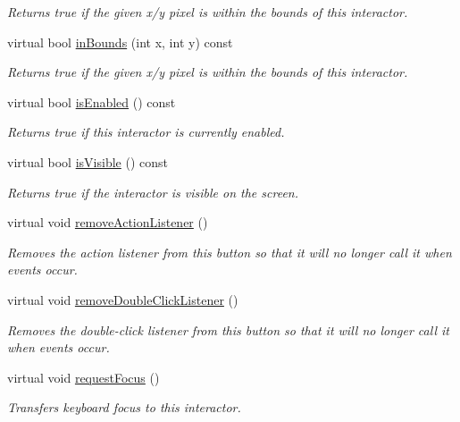 \begin{DoxyCompactItemize}
\begin{DoxyCompactList}\small\item\em Returns true if the given x/y pixel is within the bounds of this interactor. \end{DoxyCompactList}\item 
virtual bool \mbox{\hyperlink{classGInteractor_ae6d7982c1c627b677a5e776ca86118ed}{in\+Bounds}} (int x, int y) const
\begin{DoxyCompactList}\small\item\em Returns true if the given x/y pixel is within the bounds of this interactor. \end{DoxyCompactList}\item 
virtual bool \mbox{\hyperlink{classGInteractor_aacb819fb241851fd9fc045271baa4034}{is\+Enabled}} () const
\begin{DoxyCompactList}\small\item\em Returns true if this interactor is currently enabled. \end{DoxyCompactList}\item 
virtual bool \mbox{\hyperlink{classGInteractor_a9d8a6cfb13917785c143e74d40e4e2be}{is\+Visible}} () const
\begin{DoxyCompactList}\small\item\em Returns true if the interactor is visible on the screen. \end{DoxyCompactList}\item 
virtual void \mbox{\hyperlink{classGButton_ab7fe7a876367b87cf7202f947f1d05e4}{remove\+Action\+Listener}} ()
\begin{DoxyCompactList}\small\item\em Removes the action listener from this button so that it will no longer call it when events occur. \end{DoxyCompactList}\item 
virtual void \mbox{\hyperlink{classGButton_aa4250907e4cdd77349c04f0cf5cdd3d3}{remove\+Double\+Click\+Listener}} ()
\begin{DoxyCompactList}\small\item\em Removes the double-\/click listener from this button so that it will no longer call it when events occur. \end{DoxyCompactList}\item 
virtual void \mbox{\hyperlink{classGInteractor_a519fb2ac767f8b2febbb50b898b8c8cb}{request\+Focus}} ()
\begin{DoxyCompactList}\small\item\em Transfers keyboard focus to this interactor. \end{DoxyCompactList}\item 

\end{DoxyCompactItemize}
